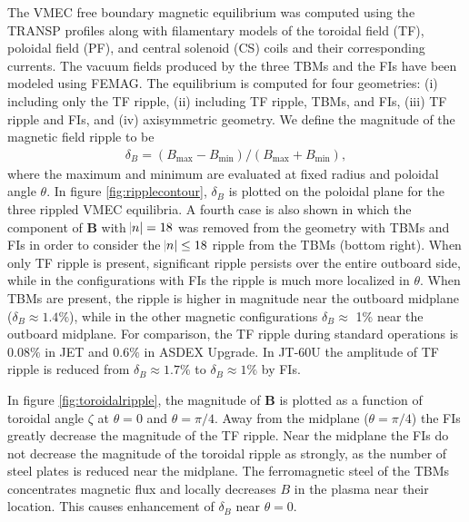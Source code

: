 \documentclass[aip, pop, preprint]{revtex4-1}
\numberwithin{figure}{section}
\numberwithin{equation}{section}
\begin{document}
\FloatBarrier

The VMEC free boundary\cite{Hirshman1986a} magnetic equilibrium was computed using the TRANSP profiles along with filamentary models of the toroidal field (TF), poloidal field (PF), and central solenoid (CS) coils and their corresponding currents. The vacuum fields produced by the three TBMs and the FIs have been modeled using FEMAG.\cite{Shinohara2009} The equilibrium is computed for four geometries: (i) including only the TF ripple, (ii) including TF ripple, TBMs, and FIs, (iii) TF ripple and FIs, and (iv) axisymmetric geometry. We define the magnitude of the magnetic field ripple to be
\begin{gather}
\delta_B = (B_{\text{max}}-B_{\text{min}})/(B_{\text{max}} + B_{\text{min}}), 
\end{gather}
where the maximum and minimum are evaluated at fixed radius and poloidal angle $\theta$. In figure \ref{fig:ripplecontour}, $\delta_B$ is plotted on the poloidal plane for the three rippled VMEC equilibria. A fourth case is also shown in which the component of $\bm{B}$ with $\abs{n} = 18$ was removed from the geometry with TBMs and FIs in order to consider the $\abs{n} \leq 18$ ripple from the TBMs (bottom right). When only TF ripple is present, significant ripple persists over the entire outboard side, while in the configurations with FIs the ripple is much more localized in $\theta$. When TBMs are present, the ripple is higher in magnitude near the outboard midplane ($\delta_B \approx 1.4\%$), while in the other magnetic configurations $\delta_B \approx$ 1\% near the outboard midplane. For comparison, the TF ripple during standard operations is $0.08\%$ in JET \cite{DeVries2008b} and $0.6\%$ in ASDEX Upgrade.\cite{Martitsch2016} In JT-60U the amplitude of TF ripple is reduced from $\delta_B \approx 1.7\%$ to $\delta_B \approx 1\%$ by FIs.\cite{Urano2007}

In figure \ref{fig:toroidalripple}, the magnitude of $\bm{B}$ is plotted as a function of toroidal angle $\zeta$ at $\theta = 0$ and $\theta = \pi/4$. Away from the midplane ($\theta = \pi/4$) the FIs greatly decrease the magnitude of the TF ripple. Near the midplane the FIs do not decrease the magnitude of the toroidal ripple as strongly, as the number of steel plates is reduced near the midplane.\cite{Shinohara2009} The ferromagnetic steel of the TBMs concentrates magnetic flux and locally decreases $B$ in the plasma near their location. This causes enhancement of $\delta_B$  near $\theta = 0$. 
\FloatBarrier
\end{document}
